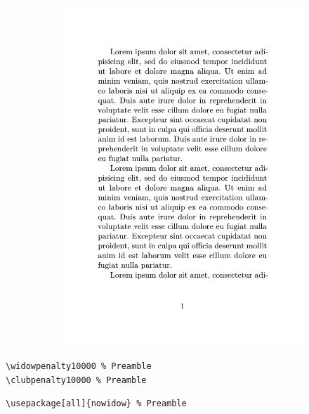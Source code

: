 \documentclass{beamer}
\begin{document}
\begin{frame}[fragile]
\begin{figure}
\begin{subfigure}{.35\textwidth}
            \includegraphics[page=2,width=\linewidth]{images/hurenkind/hurenkind.pdf}
        \end{subfigure}%
    \end{figure}
    \pause

    \begin{lstlisting}
\widowpenalty10000 % Preamble
\clubpenalty10000 % Preamble
    \end{lstlisting}

    \begin{lstlisting}
\usepackage[all]{nowidow} % Preamble
    \end{lstlisting}
\end{frame}
\end{document}
